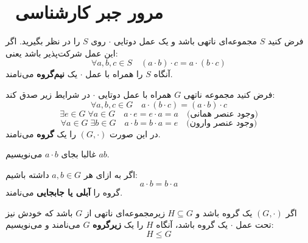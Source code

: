 

\section{ مرور جبر کارشناسی}


\begin{frame}
    \begin{definition}
        فرض کنید \( S \) مجموعه‌ای ناتهی باشد و یک عمل دوتایی \(\cdot\) روی \( S \) را در نظر بگیرید.
        اگر این عمل شرکت‌پذیر باشد یعنی:
        \[
            \forall a, b, c \in S \quad (a \cdot b) \cdot c = a \cdot (b \cdot c)
        \]
        آنگاه \( S \) را همراه با عمل \(\cdot\) یک \textbf{نیم‌گروه } می‌نامند.

    \end{definition}


\end{frame}

\begin{frame}
    \begin{definition}[گروه]
        فرض کنید مجموعه ناتهی \( G \) همراه با عمل دوتایی \(\cdot\) در شرایط زیر صدق کند:
        \[\forall a, b, c \in G \quad a \cdot (b \cdot c) = (a \cdot b) \cdot c\]
        \[\exists e \in G \; \forall a \in G \quad a \cdot e = e \cdot a = a \quad \text{(وجود عنصر همانی)}\]
        \[\forall a \in G \; \exists b \in G \quad a \cdot b = b \cdot a = e \quad \text{(وجود عنصر وارون)}\]
        در این صورت \( (G, \cdot) \) را یک \textbf{گروه} می‌نامند.

    \end{definition}
    \begin{remark}
        غالبا  بجای \( a \cdot b \) می‌نویسیم \( ab \).

    \end{remark}
\end{frame}

\begin{frame}
    \begin{definition}
        اگر به ازای هر \( a, b \in G \) داشته باشیم:
        \[
            a \cdot b = b \cdot a
        \]
        گروه را \textbf{آبلی یا جابجایی} می‌نامند.
    \end{definition}


    \begin{definition}[  زیرگروه]
        اگر \( (G, \cdot) \) یک گروه باشد و \( H \subseteq G \) زیرمجموعه‌ای ناتهی از \( G \) باشد که خودش نیز تحت عمل \(\cdot\) یک گروه باشد، آنگاه \( H \) را یک \textbf{زیرگروه} \( G \) می‌نامند و می‌نویسیم:
        \[
            H \leq G
        \]

    \end{definition}
\end{frame}

